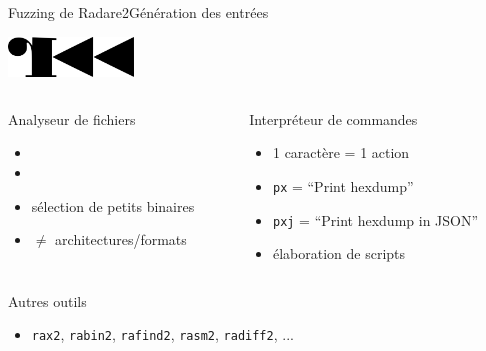\begin{frame}[fragile]{Fuzzing de Radare2}{Génération des entrées}
  \begin{center}
    \includegraphics[width=0.25\textwidth, clip=true]{../medias/radare2-logo.png}
  \end{center}

  \begin{columns}[T]
    \begin{column}{0.44\linewidth}

      \begin{block}{Analyseur de fichiers}
        \begin{itemize}
        \item{}
        \item{}
        \item{sélection de petits binaires}
        \item{$\ne$ architectures/formats}
        \end{itemize}

        \vspace{1.75ex}
      \end{block}
    \end{column}

    \begin{column}{0.44\linewidth}
      \begin{block}{Interpréteur de commandes}
        \begin{itemize}
        \item{1 caractère = 1 action}
        \item{\lstinline{px} = ``Print hexdump''}
        \item{\lstinline{pxj} = ``Print hexdump in JSON''}
        \item{élaboration de scripts}
        \end{itemize}
      \end{block}
    \end{column}
  \end{columns}
  \pause
  \vfill
  \begin{exampleblock}{Autres outils}
    \begin{itemize}
    \item{\lstinline{rax2}, \lstinline{rabin2}, \lstinline{rafind2}, \lstinline{rasm2}, \lstinline{radiff2}, ...}
    \end{itemize}
  \end{exampleblock}
\end{frame}

